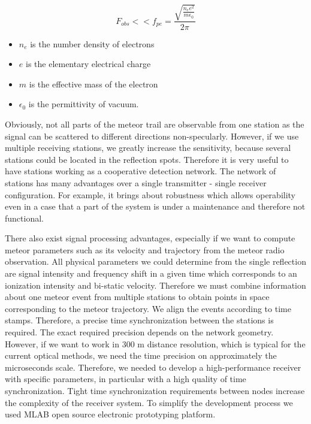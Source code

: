 \documentclass[twoside]{ctuthesis}
\theoremstyle{plain}
\theoremstyle{definition}
\theoremstyle{note}
\begin{document}
\begin{equation}
F_{obs} << f_{pe} =\frac{\sqrt{\frac{n_e e^2}{m \epsilon_0}}}{2 \pi}
\label{equ:plasma_frequency}
\end{equation}
\begin{itemize}
\item $n_e$ is the number density of electrons
\item $e$ is the elementary electrical charge
\item $m$ is the effective mass of the electron
\item $\epsilon_0$ is the permittivity of vacuum.
\end{itemize}

Obviously, not all parts of the meteor trail are observable from one station as the signal can be scattered to different directions non-specularly.
However, if we use multiple receiving stations, we greatly increase the sensitivity, because several stations could be located in the reflection spots. Therefore it is very useful to have stations working as a cooperative detection network.
The network of stations has many advantages over a single transmitter - single receiver configuration. For example, it brings about robustness which allows operability even in a case that a part of the system is under a maintenance and therefore not functional.
                   
There also exist signal processing advantages, especially if we want to compute meteor parameters such as its velocity and trajectory from the meteor radio observation. All physical parameters we could determine from the single reflection are signal intensity and frequency shift in a given time which corresponds to an ionization intensity and bi-static velocity.
Therefore we must combine information about one meteor event from multiple stations to obtain points in space corresponding to the meteor trajectory. We align the events according to time stamps. Therefore, a precise time synchronization between the stations is required. The exact required precision depends on the network geometry. However, if we want to work in 300 m distance resolution, which is typical for the current optical methods, we need the time precision on approximately the microseconds scale. Therefore, we needed to develop a high-performance receiver with specific parameters, in particular with a high quality of time synchronization. Tight time synchronization requirements between nodes increase the complexity of the receiver system. To simplify the development process we used MLAB open source electronic prototyping platform.
\end{document}
